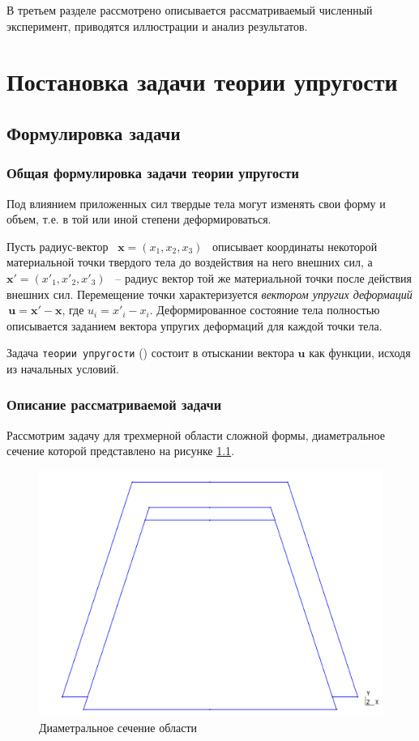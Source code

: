 \documentclass[a4paper, 14pt]{extreport}
\begin{document}
В третьем разделе рассмотрено описывается рассматриваемый 
численный эксперимент, приводятся иллюстрации и анализ 
результатов.


\chapter{Постановка задачи теории упругости}
\section{Формулировка задачи}
\subsection{Общая формулировка задачи теории упругости}


Под влиянием приложенных сил твердые тела могут изменять свои форму и объем, 
т.е. в той или иной степени деформироваться.

Пусть радиус-вектор \, $\textbf{x} = (x_1, x_2, x_3)$ \, описывает координаты 
некоторой материальной точки твердого тела до воздействия на него внешних сил,
а \, $\textbf{x}' = (x'_1, x'_2, x'_3)$ \, -- радиус вектор той же материальной
точки после действия внешних сил. Перемещение точки характеризуется 
\textit{вектором упругих деформаций} \,$\textbf{u} = \textbf{x}' - \textbf{x}$, 
где  $u_i = x'_i - x_i$. Деформированное состояние тела
полностью описывается заданием вектора упругих деформаций для каждой точки тела.

Задача \texttt{теории упругости} (\cite{math_elasticity_theory}) состоит в 
отыскании вектора $\textbf{u}$ как функции, исходя из начальных условий.

\subsection{Описание рассматриваемой задачи}

Рассмотрим задачу для трехмерной области сложной формы, диаметральное сечение
которой представлено на рисунке \ref{fig: domain}.
\begin{figure}[h]
	\center
	\includegraphics[scale=0.3]{pictures/1.png}
	\caption{Диаметральное сечение области}
	\label{fig: domain}
\end{figure}
\end{document}
